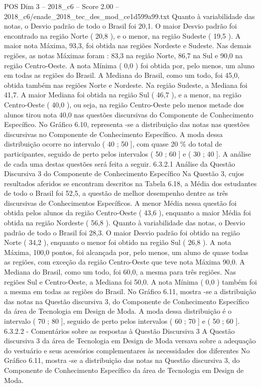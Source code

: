 \begin{textsample}{POS Dim 3 – 2018\_c6 – Score 2.00 – 2018\_c6/enade\_2018\_tec\_des\_mod\_ce1d599a99.txt}
Quanto à variabilidade das notas, o Desvio padrão de todo o Brasil foi 20,1.
O maior Desvio padrão foi encontrado na região Norte ( 20,8 ), e o menor, na região Sudeste ( 19,5 ).
A maior nota Máxima, 93,3, foi obtida nas regiões Nordeste e Sudeste.
Nas demais regiões, as notas Máximas foram : 83,3 na região Norte, 86,7 na Sul e 90,0 na região Centro-Oeste.
A nota Mínima ( 0,0 ) foi obtida por, pelo menos, um aluno em todas as regiões do Brasil.
A Mediana do Brasil, como um todo, foi 45,0, obtida também nas regiões Norte e Nordeste.
Na região Sudeste, a Mediana foi 41,7.
A maior Mediana foi obtida na região Sul ( 46,7 ), e a menor, na região Centro-Oeste ( 40,0 ), ou seja, na região Centro-Oeste pelo menos metade dos alunos tirou nota 40,0 nas questões discursivas do Componente de Conhecimento Específico.
No Gráfico 6.10, representa -se a distribuição das notas nas questões discursivas no Componente de Conhecimento Específico.
A moda dessa distribuição ocorre no intervalo ( 40 ; 50 ], com quase 20 \% do total de participantes, seguido de perto pelos intervalos ( 50 ; 60 ] e ( 30 ; 40 ].
A análise de cada uma destas questões será feita a seguir. 6.3.2.1 Análise da Questão Discursiva 3 do Componente de Conhecimento Específico Na Questão 3, cujos resultados aferidos se encontram descritos na Tabela 6.18, a Média dos estudantes de todo o Brasil foi 52,5, a questão de melhor desempenho dentre as três discursivas de Conhecimentos Específicos.
A menor Média nessa questão foi obtida pelos alunos da região Centro-Oeste ( 43,6 ), enquanto a maior Média foi obtida na região Nordeste ( 56,8 ).
Quanto à variabilidade das notas, o Desvio padrão de todo o Brasil foi 28,3.
O maior Desvio padrão foi obtido na região Norte ( 34,2 ), enquanto o menor foi obtido na região Sul ( 26,8 ).
A nota Máxima, 100,0 pontos, foi alcançada por, pelo menos, um aluno de quase todas as regiões, com exceção da região Centro-Oeste que teve nota Máxima 90,0.
A Mediana do Brasil, como um todo, foi 60,0, a mesma para três regiões.
Nas regiões Sul e Centro-Oeste, a Mediana foi 50,0.
A nota Mínima ( 0,0 ) também foi a mesma em todas as regiões do Brasil.
No Gráfico 6.11, mostra -se a distribuição das notas na Questão discursiva 3, do Componente de Conhecimento Específico da área de Tecnologia em Design de Moda.
A moda dessa distribuição é o intervalo ( 70 ; 80 ], seguido de perto pelos intervalos ( 60 ; 70 ] e ( 50 ; 60 ]. 6.3.2.2 - Comentários sobre as respostas à Questão Discursiva 3 A Questão discursiva 3 da área de Tecnologia em Design de Moda versava sobre a adequação do vestuário e seus acessórios complementares às necessidades dos diferentes No Gráfico 6.11, mostra -se a distribuição das notas na Questão discursiva 3, do Componente de Conhecimento Específico da área de Tecnologia em Design de Moda.

\end{textsample}
